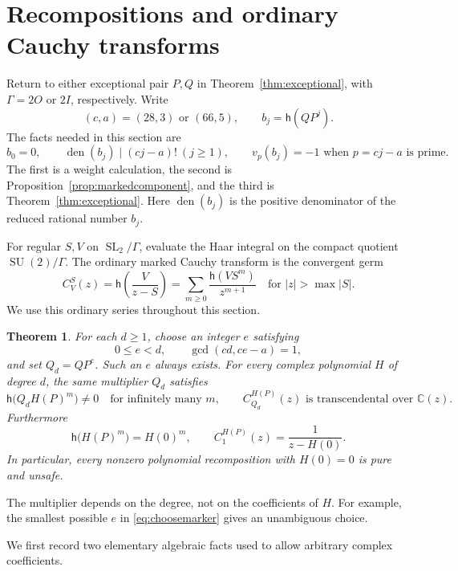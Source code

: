 \documentclass[11pt]{article}
\numberwithin{equation}{section}
\newtheorem{theorem}{Theorem}[section]
\theoremstyle{definition}
\theoremstyle{remark}
\newcommand{\C}{\mathbb C}
\newcommand{\h}{\mathsf h}
\newcommand{\SL}{\operatorname{SL}}
\newcommand{\SU}{\operatorname{SU}}
\begin{document}
\section{Recompositions and ordinary Cauchy transforms}\label{sec:recompositions}

Return to either exceptional pair $P,Q$ in
Theorem~\ref{thm:exceptional}, with $\Gamma=2O$ or $2I$, respectively.
Write
\[
 (c,a)=(28,3)\text{ or }(66,5),\qquad b_j=\h(QP^j).
\]
The facts needed in this section are
\begin{equation}\label{eq:denominatorfacts}
 b_0=0,\qquad
 \operatorname{den}(b_j)\mid(cj-a)!\ (j\geq1),\qquad
 v_p(b_j)=-1\text{ when }p=cj-a\text{ is prime}.
\end{equation}
The first is a weight calculation, the second is
Proposition~\ref{prop:markedcomponent}, and the third is
Theorem~\ref{thm:exceptional}. Here $\operatorname{den}(b_j)$ is the
positive denominator of the reduced rational number $b_j$.

For regular $S,V$ on $\SL_2/\Gamma$, evaluate the Haar integral on the
compact quotient $\SU(2)/\Gamma$. The ordinary marked Cauchy transform
is the convergent germ
\[
 C_V^S(z)=\h\left(\frac{V}{z-S}\right)
 =\sum_{m\geq0}\frac{\h(VS^m)}{z^{m+1}}
 \quad\text{for }|z|>\max|S|.
\]
We use this ordinary series throughout this section.

\begin{theorem}\label{thm:recompositions}
For each $d\geq1$, choose an integer $e$ satisfying
\begin{equation}\label{eq:choosemarker}
 0\leq e<d,\qquad \gcd(cd,ce-a)=1,
\end{equation}
and set $Q_d=QP^e$. Such an $e$ always exists. For every complex
polynomial $H$ of degree $d$, the same multiplier $Q_d$ satisfies
\[
 \h\bigl(Q_dH(P)^m\bigr)\ne0\quad\text{for infinitely many }m,
 \qquad C_{Q_d}^{H(P)}(z)\text{ is transcendental over }\C(z).
\]
Furthermore
\begin{equation}\label{eq:unitcomposed}
 \h\bigl(H(P)^m\bigr)=H(0)^m,\qquad
 C_1^{H(P)}(z)=\frac1{z-H(0)}.
\end{equation}
In particular, every nonzero polynomial recomposition with $H(0)=0$
is pure and unsafe.
\end{theorem}

The multiplier depends on the degree, not on the coefficients of $H$.
For example, the smallest possible $e$ in
\eqref{eq:choosemarker} gives an unambiguous choice.

We first record two elementary algebraic facts used to allow arbitrary
complex coefficients.
\end{document}
